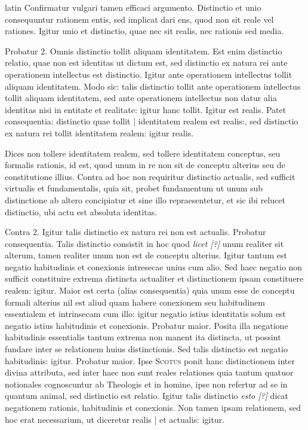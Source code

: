\begin{otherlanguage*}{latin}
\pstart
Confirmatur vulgari tamen efficaci argumento. Distinctio et unio consequuntur rationem entis, sed implicat dari ens, quod non sit reale vel rationes. Igitur unio et distinctio, quae nec sit realis, nec rationis sed media. 
\pend

\pstart
Probatur 2. Omnis distinctio tollit aliquam identitatem. Est enim distinctio relatio, quae non est identitas ut dictum est, sed distinctio ex natura rei ante operationem intellectus est distinctio. Igitur ante operationem intellectus tollit aliquam identitatem. Modo sic:
talis distinctio tollit ante operationem intellectus tollit aliquam identitatem, sed ante operationem intellectus non datur alia identitas nisi in entitate et realitate:
igitur hanc tollit. Igitur est realis. Patet consequentia:
distinctio quae tollit \textnormal{|} identitatem realem est realis:, sed distinctio ex natura rei tollit identitatem realem:
igitur realis. 
\pend

\pstart
Dices non tollere identitatem realem, sed tollere identitatem conceptus, seu formalis rationis, id est, quod unum in re non sit de conceptu alterius seu de constitutione illius. Contra ad hoc non requiritur distinctio actualis, sed sufficit virtualis et fundamentalis, quia sit, probet fundamentum ut unum sub distinctione ab altero concipiatur et sine illo repraesentetur, et sic ibi relucet distinctio, ubi actu est absoluta identitas. 
\pend

\pstart
Contra 2. Igitur talis distinctio ex natura rei non est actualis. Probatur consequentia. Talis distinctio consistit in hoc quod \emph{licet [?]} unum realiter sit alterum, tamen realiter unum non est de conceptu alterius. Igitur tantum est negatio habitudinis et conexionis intresecae unius cum alio. Sed haec negatio non sufficit constituire extrema distincta actualiter et distinctionem ipsam constituere realem:
igitur. Maior est certa (alias consequentia) quia unum esse de conceptu formali alterius nil est aliud quam habere conexionem seu habitudinem essentialem et intrinsecam cum illo:
igitur negatio istius identitatis solum est negatio istius habitudinis et conexionis. Probatur maior. Posita illa negatione habitudinis essentialis tantum extrema non manent ita distincta, ut possint fundare inter se relationem huius distinctionis. Sed talis distinctio est negatio habitudinis:
igitur. Probatur maior. Ipse \textsc{Scotus} ponit hanc distinctionem inter divina attributa, sed inter haec non sunt reales relationes quia tantum quatuor notionales cognoscuntur ab Theologis et in homine, ipse non refertur ad se in quantum animal, sed distinctio est relatio. Igitur talis distinctio \emph{esto [?]} dicat negationem rationis, habitudinis et conexionis. Non tamen ipsam relationem, sed hoc erat necessarium, ut diceretur realis \textnormal{|} et actualis:
igitur. 
\pend


\end{otherlanguage*}
